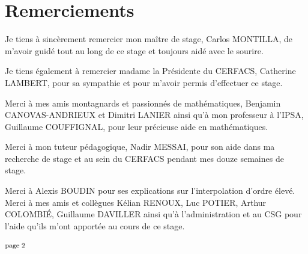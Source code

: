 \chapter*{Remerciements}

Je tiens à sincèrement remercier mon maître de stage, Carlos MONTILLA, de m'avoir guidé tout au long de ce stage et toujours aidé avec le sourire.

\vspace{0.5cm}

Je tiens également à remercier madame la Présidente du CERFACS, Catherine LAMBERT, pour sa sympathie et pour m'avoir permis d'effectuer ce stage. %

Merci à mes amis montagnards et passionnés de mathématiques, Benjamin CANOVAS-ANDRIEUX et Dimitri \mbox{LANIER} ainsi qu'à mon professeur à l'IPSA, Guillaume COUFFIGNAL, pour leur précieuse aide en mathématiques.

Merci à mon tuteur pédagogique, Nadir MESSAI, pour son aide dans ma recherche de stage et au sein du CERFACS pendant mes douze semaines de stage.

Merci à Alexis BOUDIN pour ses explications sur l'interpolation d'ordre élevé.
Merci à mes amis et collègues Kélian RENOUX, Luc POTIER, Arthur COLOMBIÉ, Guillaume DAVILLER ainsi qu'à l'administration et au CSG pour l'aide qu'ils m'ont apportée au cours de ce stage.




\vspace*{\fill} %
\begin{center}
    \includegraphics[width=0.067\textwidth]{images/page_2.png}
\end{center}
\vspace*{-13.5cm} %
\vspace*{\fill} %

